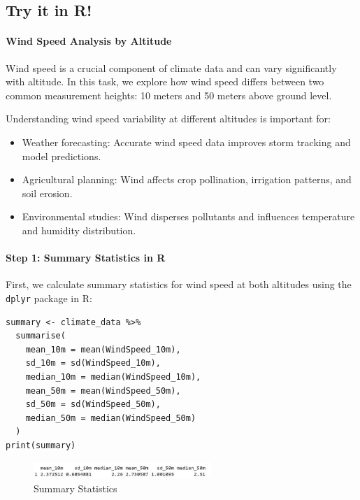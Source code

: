 \subsection*{Try it in R!}

\paragraph{Wind Speed Analysis by Altitude}

Wind speed is a crucial component of climate data and can vary significantly with altitude. In this task, we explore how wind speed differs between two common measurement heights: 10 meters and 50 meters above ground level.

Understanding wind speed variability at different altitudes is important for:
\begin{itemize}
  \item Weather forecasting: Accurate wind speed data improves storm tracking and model predictions.
  \item Agricultural planning: Wind affects crop pollination, irrigation patterns, and soil erosion.
  \item Environmental studies: Wind disperses pollutants and influences temperature and humidity distribution.
\end{itemize}

\paragraph{Step 1: Summary Statistics in R}

First, we calculate summary statistics for wind speed at both altitudes using the \texttt{dplyr} package in R:

\begin{verbatim}
summary <- climate_data %>%
  summarise(
    mean_10m = mean(WindSpeed_10m),
    sd_10m = sd(WindSpeed_10m),
    median_10m = median(WindSpeed_10m),
    mean_50m = mean(WindSpeed_50m),
    sd_50m = sd(WindSpeed_50m),
    median_50m = median(WindSpeed_50m)
  )
print(summary)
\end{verbatim}

\begin{figure}[h]
\centering
\includegraphics[width=0.6\textwidth]{figures/summ_stats.jpg}
\caption{Summary Statistics}
\end{figure}

